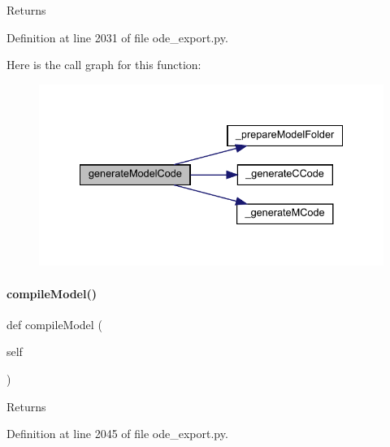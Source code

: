 \begin{DoxyReturn}{Returns}

\end{DoxyReturn}


Definition at line 2031 of file ode\+\_\+export.\+py.

Here is the call graph for this function\+:
\nopagebreak
\begin{figure}[H]
\begin{center}
\leavevmode
\includegraphics[width=334pt]{classamici_1_1ode__export_1_1_o_d_e_exporter_a3ec6677c764c1a2d57a51d8a9f468310_cgraph}
\end{center}
\end{figure}
\mbox{\label{classamici_1_1ode__export_1_1_o_d_e_exporter_a61bf03049b9989d73b584fbca9f8d499}} 
\paragraph{\texorpdfstring{compileModel()}{compileModel()}}
{\footnotesize\ttfamily def compile\+Model (\begin{DoxyParamCaption}\item[{}]{self }\end{DoxyParamCaption})}

\begin{DoxyReturn}{Returns}

\end{DoxyReturn}


Definition at line 2045 of file ode\+\_\+export.\+py.

